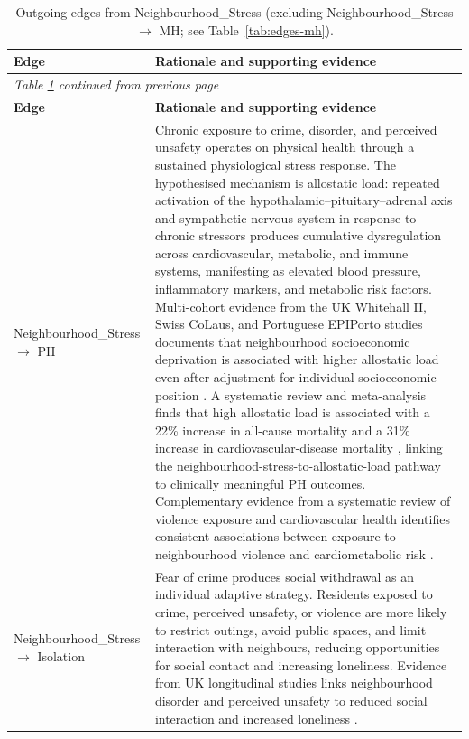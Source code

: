 
\begin{longtable}{@{}p{3.8cm}p{11.2cm}@{}}
\caption{Outgoing edges from Neighbourhood\_Stress (excluding Neighbourhood\_Stress $\to$ MH; see Table~\ref{tab:edges-mh}).}
\label{tab:edges-neighbourhood_stress}\\
\toprule
\textbf{Edge} & \textbf{Rationale and supporting evidence} \\
\midrule
\endfirsthead
\multicolumn{2}{l}{\textit{Table \ref{tab:edges-neighbourhood_stress} continued from previous page}}\\
\toprule
\textbf{Edge} & \textbf{Rationale and supporting evidence} \\
\midrule
\endhead
\bottomrule
\endfoot
Neighbourhood\_Stress $\to$ PH & Chronic exposure to crime, disorder, and perceived unsafety operates on physical health through a sustained physiological stress response. The hypothesised mechanism is allostatic load: repeated activation of the hypothalamic--pituitary--adrenal axis and sympathetic nervous system in response to chronic stressors produces cumulative dysregulation across cardiovascular, metabolic, and immune systems, manifesting as elevated blood pressure, inflammatory markers, and metabolic risk factors. Multi-cohort evidence from the UK Whitehall II, Swiss CoLaus, and Portuguese EPIPorto studies documents that neighbourhood socioeconomic deprivation is associated with higher allostatic load even after adjustment for individual socioeconomic position \citep{ribeiro_neighbourhood_2019}. A systematic review and meta-analysis finds that high allostatic load is associated with a 22\% increase in all-cause mortality and a 31\% increase in cardiovascular-disease mortality \citep{}, linking the neighbourhood-stress-to-allostatic-load pathway to clinically meaningful PH outcomes. Complementary evidence from a systematic review of violence exposure and cardiovascular health identifies consistent associations between exposure to neighbourhood violence and cardiometabolic risk \citep{suglia_violence_2015}. \\
\addlinespace
Neighbourhood\_Stress $\to$ Isolation & Fear of crime produces social withdrawal as an individual adaptive strategy. Residents exposed to crime, perceived unsafety, or violence are more likely to restrict outings, avoid public spaces, and limit interaction with neighbours, reducing opportunities for social contact and increasing loneliness. Evidence from UK longitudinal studies links neighbourhood disorder and perceived unsafety to reduced social interaction and increased loneliness \citep{bowling_how_2007}. \\

\end{longtable}
